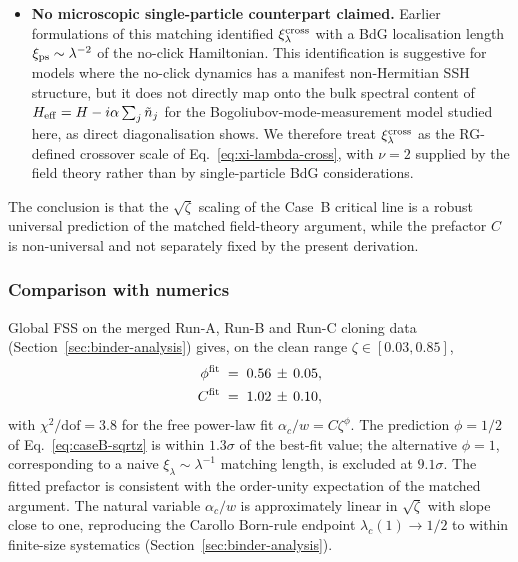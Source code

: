 \begin{itemize}
  \item \textbf{No microscopic single-particle counterpart claimed.}
    Earlier formulations of this matching identified
    $\xi_\lambda^{\rm cross}$ with a BdG localisation length
    $\xi_{\rm ps}\sim\lambda^{-2}$ of the no-click Hamiltonian.  This
    identification is suggestive for models where the no-click
    dynamics has a manifest non-Hermitian SSH structure, but it does
    not directly map onto the bulk spectral content of
    $H_{\rm eff}=H-i\alpha\sum_j\tilde n_j$ for the
    Bogoliubov-mode-measurement model studied here, as direct
    diagonalisation shows.  We therefore treat
    $\xi_\lambda^{\rm cross}$ as the RG-defined crossover scale of
    Eq.~\eqref{eq:xi-lambda-cross}, with $\nu=2$ supplied by the
    field theory rather than by single-particle BdG considerations.
\end{itemize}

The conclusion is that the $\sqrt{\zeta}$ scaling of the Case~B
critical line is a robust universal prediction of the matched
field-theory argument, while the prefactor $C$ is non-universal and
not separately fixed by the present derivation.

\subsubsection{Comparison with numerics}
\label{subsubsec:numerics-match}

Global FSS on the merged Run-A, Run-B and Run-C cloning data
(Section~\ref{sec:binder-analysis}) gives, on the clean range
$\zeta\in[0.03,0.85]$,
\begin{align}
  \phi^{\rm fit} &\;=\; 0.56 \,\pm\, 0.05, \\
  C^{\rm fit}    &\;=\; 1.02 \,\pm\, 0.10,
\end{align}
with $\chi^2/\text{dof}=3.8$ for the free power-law fit
$\alpha_c/w=C\zeta^\phi$.  The prediction $\phi=1/2$ of
Eq.~\eqref{eq:caseB-sqrtz} is within $1.3\sigma$ of the best-fit
value; the alternative $\phi=1$, corresponding to a naive
$\xi_\lambda\sim\lambda^{-1}$ matching length, is excluded at
$9.1\sigma$.  The fitted prefactor is consistent with the order-unity
expectation of the matched argument.  The natural variable
$\alpha_c/w$ is approximately linear in $\sqrt{\zeta}$ with slope
close to one, reproducing the Carollo Born-rule endpoint
$\lambda_c(1)\to 1/2$ to within finite-size systematics
(Section~\ref{sec:binder-analysis}).

